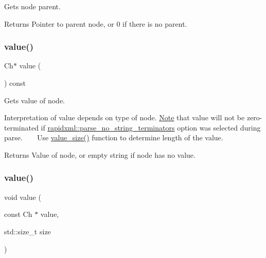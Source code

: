 Gets node parent. 

\begin{DoxyReturn}{Returns}
Pointer to parent node, or 0 if there is no parent. 
\end{DoxyReturn}
\mbox{\label{classrapidxml_1_1xml__base_a558b1045e6751e4024309d41bf35c542}} 
\subsubsection{\texorpdfstring{value()}{value()}\hspace{0.1cm}{\footnotesize\ttfamily [1/3]}}
{\footnotesize\ttfamily Ch$\ast$ value (\begin{DoxyParamCaption}{ }\end{DoxyParamCaption}) const\hspace{0.3cm}{\ttfamily [inline]}}



Gets value of node. 

Interpretation of value depends on type of node. \mbox{\hyperlink{classNote}{Note}} that value will not be zero-\/terminated if \mbox{\hyperlink{namespacerapidxml_a9cae3801e70437cbc410c24bf6be691c}{rapidxml\+::parse\+\_\+no\+\_\+string\+\_\+terminators}} option was selected during parse. ~\newline
~\newline
 Use \mbox{\hyperlink{classrapidxml_1_1xml__base_aa6981b3244607ea4ae7634f74f25361b}{value\+\_\+size()}} function to determine length of the value. \begin{DoxyReturn}{Returns}
Value of node, or empty string if node has no value. 
\end{DoxyReturn}
\mbox{\label{classrapidxml_1_1xml__base_ad9640aa3f5374673cb72a5289b6c91eb}} 
\subsubsection{\texorpdfstring{value()}{value()}\hspace{0.1cm}{\footnotesize\ttfamily [2/3]}}
{\footnotesize\ttfamily void value (\begin{DoxyParamCaption}\item[{const Ch $\ast$}]{value,  }\item[{std\+::size\+\_\+t}]{size }\end{DoxyParamCaption})\hspace{0.3cm}{\ttfamily [inline]}}




